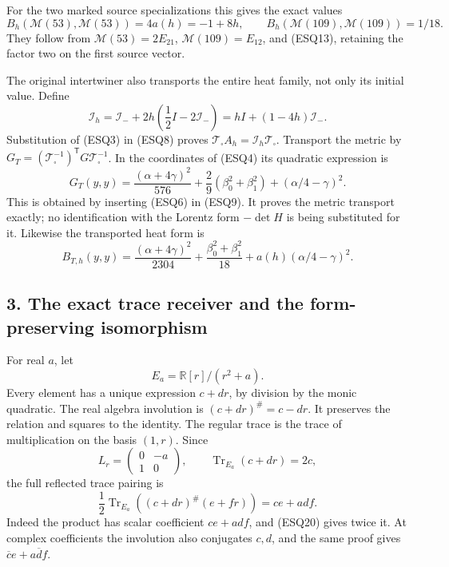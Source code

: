 \documentclass[
  10pt,
  a4paper,
]{article}
\begin{document}
For the two marked source specializations this gives the exact values \[
B_h(\mathcal M(53),\mathcal M(53))=4a(h)=-1+8h,
\qquad
B_h(\mathcal M(109),\mathcal M(109))=1/18.
\tag{ESQ15a}
\] They follow from \(\mathcal M(53)=2E_{21}\),
\(\mathcal M(109)=E_{12}\), and (ESQ13), retaining the factor two on the
first source vector.

The original intertwiner also transports the entire heat family, not
only its initial value. Define \[
\mathcal I_h=\mathcal I_-+2h\left(\frac12I-2\mathcal I_-\right)
=hI+(1-4h)\mathcal I_-.
\tag{ESQ16}
\] Substitution of (ESQ3) in (ESQ8) proves
\(\mathcal T_\square A_h=\mathcal I_h\mathcal T_\square\). Transport the
metric by
\(G_T=(\mathcal T_\square^{-1})^{\mathsf T}G\mathcal T_\square^{-1}\).
In the coordinates of (ESQ4) its quadratic expression is \[
G_T(y,y)=\frac{(\alpha+4\gamma)^2}{576}
+\frac29(\beta_0^2+\beta_1^2)+(\alpha/4-\gamma)^2.
\tag{ESQ17}
\] This is obtained by inserting (ESQ6) in (ESQ9). It proves the metric
transport exactly; no identification with the Lorentz form \(-\det H\)
is being substituted for it. Likewise the transported heat form is \[
B_{T,h}(y,y)=\frac{(\alpha+4\gamma)^2}{2304}
+\frac{\beta_0^2+\beta_1^2}{18}
+a(h)(\alpha/4-\gamma)^2.
\tag{ESQ18}
\]

\subsection{3. The exact trace receiver and the form-preserving
isomorphism}\label{the-exact-trace-receiver-and-the-form-preserving-isomorphism}

For real \(a\), let \[
E_a=\mathbb R[r]/(r^2+a).
\tag{ESQ19}
\] Every element has a unique expression \(c+dr\), by division by the
monic quadratic. The real algebra involution is \((c+dr)^\#=c-dr\). It
preserves the relation and squares to the identity. The regular trace is
the trace of multiplication on the basis \((1,r)\). Since \[
L_r=\begin{pmatrix}0&-a\\1&0\end{pmatrix},
\qquad \operatorname{Tr}_{E_a}(c+dr)=2c,
\tag{ESQ20}
\] the full reflected trace pairing is \[
\frac12\operatorname{Tr}_{E_a}((c+dr)^\#(e+fr))=ce+a df.
\tag{ESQ21}
\] Indeed the product has scalar coefficient \(ce+a df\), and (ESQ20)
gives twice it. At complex coefficients the involution also conjugates
\(c,d\), and the same proof gives \(\overline c e+a\overline d f\).
\end{document}
